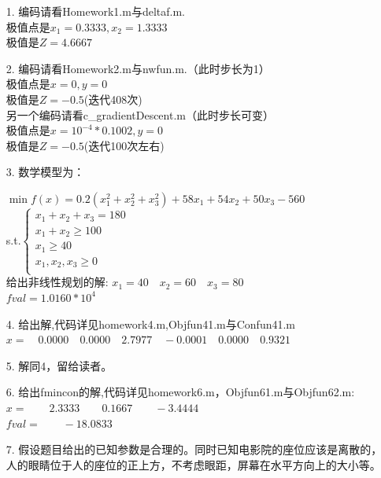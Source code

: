 \documentclass[a4paper,20pt]{article}
\title{}
\author{}
\date{}
\begin{document}
\renewcommand{\lstlistlistingname}{代码汇总}
\renewcommand{\lstlistingname}{代码}
\renewcommand\tablename{表}
\begin{itemize}
    \item[1.]编码请看Homework1.m与deltaf.m.
    \\极值点是$x_1=0.3333,x_2=1.3333$
    \\极值是$Z=4.6667$
    \item[2.]编码请看Homework2.m与nwfun.m.（此时步长为1）
    \\极值点是$x=0,y=0$
    \\极值是$Z=-0.5$(迭代408次)
    \\另一个编码请看c\_gradientDescent.m（此时步长可变）
    \\极值点是$ x=10^{-4}*0.1002,y=0$
    \\极值是$Z=-0.5$(迭代100次左右)
    \item[3.]   数学模型为：
        \par \noindent $\min f(x)=0.2(x_1^2+x_2^2+x_3^2)+58x_1+54x_2+50x_3-560$
        \\s.t.$\left\{\begin{matrix}
                x_1+x_2+x_3=180    \\
                x_1+x_2\geq 100    \\
                x_1 \geq 40        \\
                x_1,x_2,x_3 \geq 0 \\
            \end{matrix} \right.$
        \\给出非线性规划的解:   $x_1=40
            \quad x_2=60
            \quad x_3=80$
        \\$fval =1.0160*10^{4}$
    \item[4.] 给出解,代码详见homework4.m,Objfun41.m与Confun41.m
        \\$x =\quad  0.0000  \quad  0.0000  \quad  2.7977 \quad  -0.0001  \quad  0.0000  \quad  0.9321$
    \item[5.] 解同4，留给读者。
    \item[6.] 给出fmincon的解,代码详见homework6.m，Objfun61.m与Objfun62.m:
        \\$x =\qquad    2.3333 \qquad   0.1667 \qquad  -3.4444$
            \\$fval =\qquad  -18.0833 $
    \item [7.]假设题目给出的已知参数是合理的。同时已知电影院的座位应该是离散的，人的眼睛位于人的座位的正上方，不考虑眼距，屏幕在水平方向上的大小等。

\end{itemize}
\end{document}
